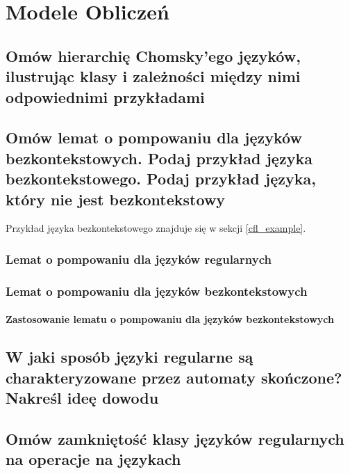 \chapter{Modele Obliczeń}

\section{Omów hierarchię Chomsky’ego języków, ilustrując klasy i zależności między
  nimi odpowiednimi przykładami}


\section{Omów lemat o pompowaniu dla języków bezkontekstowych. Podaj przykład
  języka bezkontekstowego. Podaj przykład języka, który nie jest bezkontekstowy}

Przykład języka bezkontekstowego znajduje się w sekcji \ref{cfl_example}.

\subsection{Lemat o pompowaniu dla języków regularnych}
\label{regular-pumping}


\subsection{Lemat o pompowaniu dla języków bezkontekstowych}


\subsubsection{Zastosowanie lematu o pompowaniu dla języków bezkontekstowych}
\label{context-pumping}


\section{W jaki sposób języki regularne są charakteryzowane przez automaty skończone?
  Nakreśl ideę dowodu}


\section{Omów zamkniętość klasy języków regularnych na operacje na językach}


